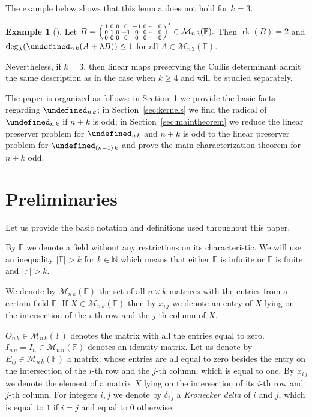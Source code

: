 \documentclass{elsarticle}
\DeclareMathOperator{\rk}{rk}
\def\F{{\mathbb F}}
\def\M{{\mathcal M}}
\let\det\undefined
\DeclareMathOperator{\det}{det}
\newenvironment{psmallmatrix}
  {\left(\begin{smallmatrix}}
  {\end{smallmatrix}\right)}
\theoremstyle{plain}
\theoremstyle{definition}
\newtheorem{example}[theorem]{Example}
\numberwithin{equation}{section}
\begin{document}
The example below shows that this lemma does not hold for $k = 3$.

\begin{example}[{\cite[Example~5.11]{Guterman2025}}]\label{cex:K3NKEvenInt}Let $B = \begin{psmallmatrix}
                                 1 & 0 & 0 & 0 & -1 & 0 & \cdots & 0\\
                                 0 & 1 & 0 & -1 & 0 & 0 & \cdots & 0\\
                                 0 & 0 & 0 & 0 & 0 & 0 & \cdots & 0
                                        \end{psmallmatrix}^t \in \M_{n\,3}(\F).$ Then $\rk (B) = 2$ and $\deg_{\lambda} (\det_{n\,k}(A + \lambda B)) \le 1$ for all $A \in \M_{n\,3}(\F)$.
\end{example}

Nevertheless, if $k = 3$, then linear maps preserving the Cullis determinant admit the same description as in the case when $k \ge 4$ and will be studied separately.\bigskip

The paper is organized as follows: in Section~\ref{sec:prelim} we provide the basic facts regarding $\det_{n\,k}$; in Section~\ref{sec:kernels} we find the radical of $\det_{n\,k}$ if $n + k$ is odd; in Section~\ref{sec:maintheorem} we reduce the linear preserver problem for $\det_{n\,k}$ and $n + k$ is odd to the linear preserver problem for $\det_{(n-1)\,k}$ and prove the main characterization theorem for $n + k$ odd.

\section{Preliminaries}\label{sec:prelim}

Let us provide the basic notation and definitions used throughout this paper.%

By $\F$ we denote a field without any restrictions on its characteristic. We will use an inequality $|\F| > k$ for $k \in \mathbb N$ which means that either $\F$ is infinite or $\F$ is finite and $|\F| > k$.

We denote by $\M_{n\, k}(\F)$ the set of all $n\times k$ matrices with the entries from a certain field $\F.$ If $X \in \M_{n\,k}(\F)$ then by $x_{i\, j}$ we denote an entry of $X$ lying on the intersection of the $i$-th row and the $j$-th column of $X$.

$O_{n\, k}\in \M_{n\, k}(\F)$ denotes the matrix with all the entries equal to zero. $I_{n\, n} = I_{n} \in \M_{n\, n}(\F)$ denotes an identity matrix. Let us denote by $E_{ij} \in \M_{n\, k}(\mathbb F)$ a matrix, whose entries are all equal to zero besides the entry on the intersection of the $i$-th row and the $j$-th column, which is equal to one. By $x_{i\, j}$ we denote the element of a matrix $X$ lying on the intersection of its $i$-th row and $j$-th column.  For integers $i, j$ we denote by $\delta_{i\,j}$  a \emph{Kronecker delta} of $i$ and $j$, which is equal to $1$ if $i = j$ and equal to $0$ otherwise.
\end{document}
